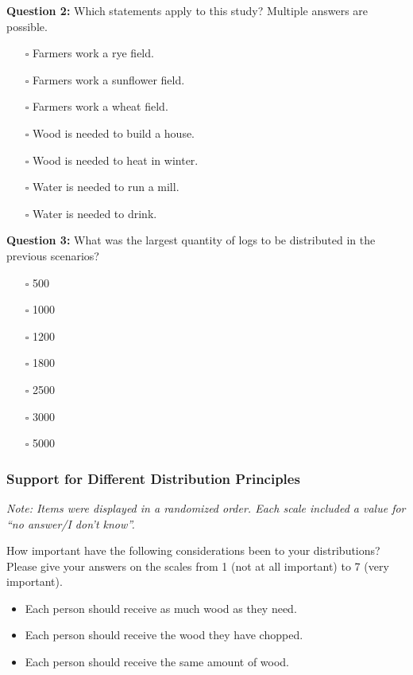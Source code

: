 \documentclass[egregdoesnotlikesansseriftitles]{scrartcl}
\begin{document}
\noindent\textbf{Question 2:} Which statements apply to this study?
Multiple answers are possible.
\begin{itemize}
   \item[$\square$] Farmers work a rye field.
   \item[$\square$] Farmers work a sunflower field.
   \item[$\square$] Farmers work a wheat field.
   \item[$\square$] Wood is needed to build a house.
   \item[$\square$] Wood is needed to heat in winter.
   \item[$\square$] Water is needed to run a mill.
   \item[$\square$] Water is needed to drink.
\end{itemize}\vspace{1ex}

\noindent\textbf{Question 3:} What was the largest quantity of logs to be distributed in the previous scenarios?
\begin{itemize}
   \item[$\square$] 500
   \item[$\square$] 1000
   \item[$\square$] 1200
   \item[$\square$] 1800
   \item[$\square$] 2500
   \item[$\square$] 3000
   \item[$\square$] 5000
\end{itemize}

\subsubsection*{Support for Different Distribution Principles}
\noindent\textit{Note: Items were displayed in a randomized order. Each scale included a value for ``no answer/I don't know''.}\vspace{1ex}

\noindent How important have the following considerations been to your distributions?
Please give your answers on the scales from 1 (not at all important) to 7 (very important).
\begin{itemize}
   \item Each person should receive as much wood as they need.
   \item Each person should receive the wood they have chopped.
   \item Each person should receive the same amount of wood.
\end{itemize}
\end{document}
